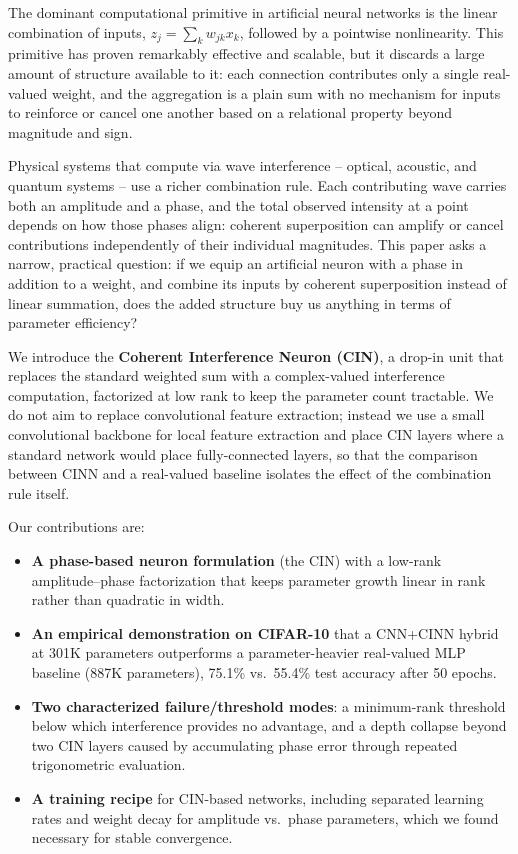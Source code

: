 \documentclass[11pt]{article}
\begin{document}
The dominant computational primitive in artificial neural networks is the linear combination of inputs, $z_j = \sum_k w_{jk} x_k$, followed by a pointwise nonlinearity. This primitive has proven remarkably effective and scalable, but it discards a large amount of structure available to it: each connection contributes only a single real-valued weight, and the aggregation is a plain sum with no mechanism for inputs to reinforce or cancel one another based on a relational property beyond magnitude and sign.

Physical systems that compute via wave interference -- optical, acoustic, and quantum systems -- use a richer combination rule. Each contributing wave carries both an amplitude and a phase, and the total observed intensity at a point depends on how those phases align: coherent superposition can amplify or cancel contributions independently of their individual magnitudes. This paper asks a narrow, practical question: if we equip an artificial neuron with a phase in addition to a weight, and combine its inputs by coherent superposition instead of linear summation, does the added structure buy us anything in terms of parameter efficiency?

We introduce the \textbf{Coherent Interference Neuron (CIN)}, a drop-in unit that replaces the standard weighted sum with a complex-valued interference computation, factorized at low rank to keep the parameter count tractable. We do not aim to replace convolutional feature extraction; instead we use a small convolutional backbone for local feature extraction and place CIN layers where a standard network would place fully-connected layers, so that the comparison between CINN and a real-valued baseline isolates the effect of the combination rule itself.

Our contributions are:
\begin{itemize}
    \item \textbf{A phase-based neuron formulation} (the CIN) with a low-rank amplitude--phase factorization that keeps parameter growth linear in rank rather than quadratic in width.
    \item \textbf{An empirical demonstration on CIFAR-10} that a CNN+CINN hybrid at 301K parameters outperforms a parameter-heavier real-valued MLP baseline (887K parameters), 75.1\% vs.\ 55.4\% test accuracy after 50 epochs.
    \item \textbf{Two characterized failure/threshold modes}: a minimum-rank threshold below which interference provides no advantage, and a depth collapse beyond two CIN layers caused by accumulating phase error through repeated trigonometric evaluation.
    \item \textbf{A training recipe} for CIN-based networks, including separated learning rates and weight decay for amplitude vs.\ phase parameters, which we found necessary for stable convergence.
\end{itemize}
\end{document}
